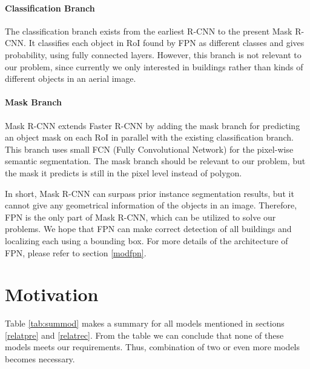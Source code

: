 \paragraph{Classification Branch}
The classification branch exists from the earliest R-CNN to the present Mask R-CNN.  It classifies each object in RoI found by FPN as different classes and gives probability, using fully connected layers. However, this branch is not relevant to our problem, since currently we only interested in buildings rather than kinds of different objects in an aerial image.

\paragraph{Mask Branch}
Mask R-CNN extends Faster R-CNN by adding the mask branch for predicting an object mask on each RoI in parallel with the existing classification branch. This branch uses small FCN (Fully Convolutional Network) for the pixel-wise semantic segmentation. The mask branch should be relevant to our problem, but the mask it predicts is still in the pixel level instead of polygon.

In short, Mask R-CNN can surpass prior instance segmentation results, but it cannot give any geometrical information of the objects in an image. Therefore, FPN is the only part of Mask R-CNN, which can be utilized to solve our problems. We hope that FPN can make correct detection of all buildings and localizing each using a bounding box. For more details of the architecture of FPN, please refer to section \ref{modfpn}.

\section{Motivation}\label{relatmot}
Table \ref{tab:summod} makes a summary for all models mentioned in sections \ref{relatpre} and \ref{relatrec}. From the table we can conclude that none of these models meets our requirements. Thus, combination of two or even more models becomes necessary.


